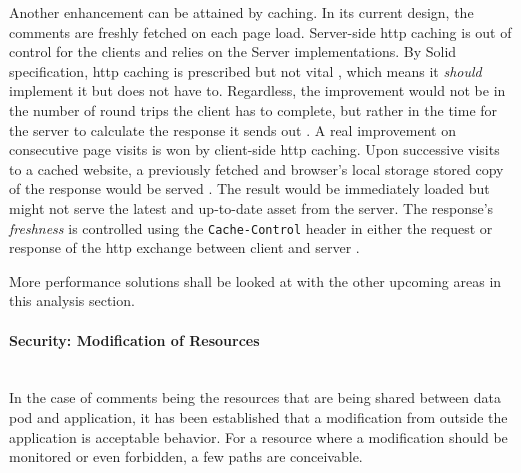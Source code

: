 Another enhancement can be attained by caching. In its current design, the comments are freshly fetched on each page load. Server-side \gls{http} caching is out of control for the clients and relies on the Server implementations. By Solid specification, \gls{http} caching is prescribed but not vital \cite{solid-protocol}, which means it \textit{should} implement it but does not have to. Regardless, the improvement would not be in the number of round trips the client has to complete, but rather in the time for the server to calculate the response it sends out \cite{http-caching}. A real improvement on consecutive page visits is won by client-side \gls{http} caching. Upon successive visits to a cached website, a previously fetched and browser's local storage stored copy of the response would be served \cite{http-caching}. The result would be immediately loaded but might not serve the latest and up-to-date asset from the server. The response's \textit{freshness} is controlled using the \texttt{Cache-Control} header in either the request or response of the \gls{http} exchange between client and server \cite{http-caching}. 

More performance solutions shall be looked at with the other upcoming areas in this analysis section.
\vspace{0.5cm}
\paragraph{Security: Modification of Resources}\mbox{}\\

In the case of comments being the resources that are being shared between data pod and application, it has been established that a modification from outside the application is acceptable behavior. For a resource where a modification should be monitored or even forbidden, a few paths are conceivable.

